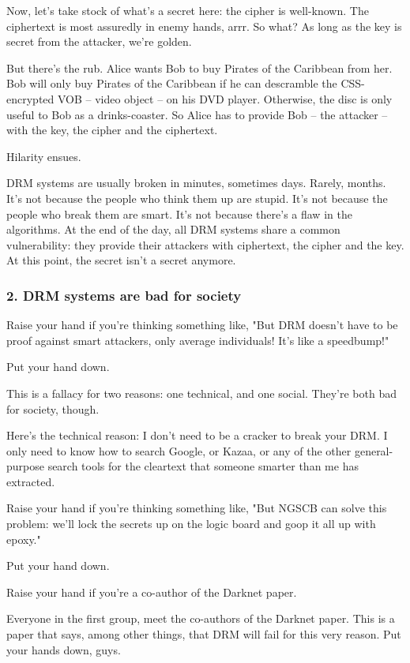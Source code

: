 Now, let's take stock of what's a secret here: the cipher is
well-known. The ciphertext is most assuredly in enemy hands, arrr.
So what? As long as the key is secret from the attacker, we're
golden.

But there's the rub. Alice wants Bob to buy Pirates of the
Caribbean from her. Bob will only buy Pirates of the Caribbean if
he can descramble the CSS-encrypted VOB -- video object -- on his
DVD player. Otherwise, the disc is only useful to Bob as a
drinks-coaster. So Alice has to provide Bob -- the attacker -- with
the key, the cipher and the ciphertext.

Hilarity ensues.

DRM systems are usually broken in minutes, sometimes days. Rarely,
months. It's not because the people who think them up are stupid.
It's not because the people who break them are smart. It's not
because there's a flaw in the algorithms. At the end of the day,
all DRM systems share a common vulnerability: they provide their
attackers with ciphertext, the cipher and the key. At this point,
the secret isn't a secret anymore.

\subsubsection{2. DRM systems are bad for society}

Raise your hand if you're thinking something like, "But DRM doesn't
have to be proof against smart attackers, only average individuals!
It's like a speedbump!"

Put your hand down.

This is a fallacy for two reasons: one technical, and one social.
They're both bad for society, though.

Here's the technical reason: I don't need to be a cracker to break
your DRM. I only need to know how to search Google, or Kazaa, or
any of the other general-purpose search tools for the cleartext
that someone smarter than me has extracted.

Raise your hand if you're thinking something like, "But NGSCB can
solve this problem: we'll lock the secrets up on the logic board
and goop it all up with epoxy."

Put your hand down.

Raise your hand if you're a co-author of the Darknet paper.

Everyone in the first group, meet the co-authors of the Darknet
paper. This is a paper that says, among other things, that DRM will
fail for this very reason. Put your hands down, guys.

